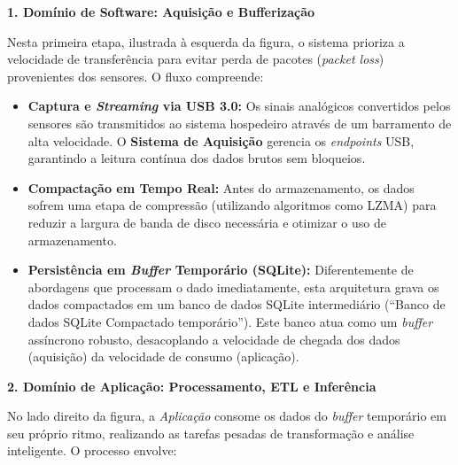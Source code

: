 \noindent \textbf{1. Domínio de Software: Aquisição e Bufferização}

Nesta primeira etapa, ilustrada à esquerda da figura, o sistema prioriza a velocidade de transferência para evitar perda de pacotes (\textit{packet loss}) provenientes dos sensores. O fluxo compreende:

\begin{itemize} \item \textbf{Captura e \textit{Streaming} via USB 3.0:} Os sinais analógicos convertidos pelos sensores são transmitidos ao sistema hospedeiro através de um barramento de alta velocidade. O \textbf{Sistema de Aquisição} gerencia os \textit{endpoints} USB, garantindo a leitura contínua dos dados brutos sem bloqueios.
	
	\item \textbf{Compactação em Tempo Real:} Antes do armazenamento, os dados sofrem uma etapa de compressão (utilizando algoritmos como LZMA) para reduzir a largura de banda de disco necessária e otimizar o uso de armazenamento.
	
	\item \textbf{Persistência em \textit{Buffer} Temporário (SQLite):} Diferentemente de abordagens que processam o dado imediatamente, esta arquitetura grava os dados compactados em um banco de dados SQLite intermediário (``Banco de dados SQLite Compactado temporário''). Este banco atua como um \textit{buffer} assíncrono robusto, desacoplando a velocidade de chegada dos dados (aquisição) da velocidade de consumo (aplicação).
\end{itemize}

\noindent \textbf{2. Domínio de Aplicação: Processamento, ETL e Inferência}

No lado direito da figura, a \textit{Aplicação} consome os dados do \textit{buffer} temporário em seu próprio ritmo, realizando as tarefas pesadas de transformação e análise inteligente. O processo envolve:

